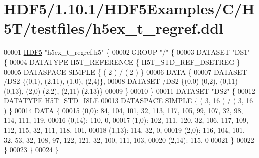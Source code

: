 \hypertarget{_h_d_f5_21_810_81_2_h_d_f5_examples_2_c_2_h5_t_2testfiles_2h5ex__t__regref_8ddl_source}{}\section{H\+D\+F5/1.10.1/\+H\+D\+F5\+Examples/\+C/\+H5\+T/testfiles/h5ex\+\_\+t\+\_\+regref.ddl}
\label{_h_d_f5_21_810_81_2_h_d_f5_examples_2_c_2_h5_t_2testfiles_2h5ex__t__regref_8ddl_source}

\begin{DoxyCode}
00001 \hyperlink{namespace_h_d_f5}{HDF5} \textcolor{stringliteral}{"h5ex\_t\_regref.h5"} \{
00002 GROUP \textcolor{stringliteral}{"/"} \{
00003    DATASET \textcolor{stringliteral}{"DS1"} \{
00004       DATATYPE  H5T\_REFERENCE \{ H5T\_STD\_REF\_DSETREG \}
00005       DATASPACE  SIMPLE \{ ( 2 ) / ( 2 ) \}
00006       DATA \{
00007          DATASET /DS2 \{(0,1), (2,11), (1,0), (2,4)\},
00008          DATASET /DS2 \{(0,0)-(0,2), (0,11)-(0,13), (2,0)-(2,2), (2,11)-(2,13)\}
00009       \}
00010    \}
00011    DATASET \textcolor{stringliteral}{"DS2"} \{
00012       DATATYPE  H5T\_STD\_I8LE
00013       DATASPACE  SIMPLE \{ ( 3, 16 ) / ( 3, 16 ) \}
00014       DATA \{
00015       (0,0): 84, 104, 101, 32, 113, 117, 105, 99, 107, 32, 98, 114, 111, 119,
00016       (0,14): 110, 0,
00017       (1,0): 102, 111, 120, 32, 106, 117, 109, 112, 115, 32, 111, 118, 101,
00018       (1,13): 114, 32, 0,
00019       (2,0): 116, 104, 101, 32, 53, 32, 108, 97, 122, 121, 32, 100, 111, 103,
00020       (2,14): 115, 0
00021       \}
00022    \}
00023 \}
00024 \}
\end{DoxyCode}

